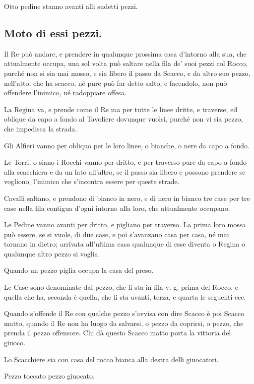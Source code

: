 \documentclass[11pt,a6paper]{article}
\begin{document}
Otto pedine stanno avanti alli sudetti
pezzi.

\subsection{Moto di essi pezzi.}

Il Re può andare, e prendere in qualunque
prossima casa d'intorno alla sua, che
attualmente occupa, una sol volta può saltare
nella fila de' suoi pezzi col Rocco, purché
non si sia mai mosso, e sia libero il passo da
Scacco, e da altro suo pezzo, nell'atto, che
ha scacco, né pure può far detto salto, e
facendolo, non può offendere l'inimico, né radoppiare
offesa.

La Regina va, e prende come il Re ma
per tutte le linee dritte, e traverse, ed oblique
da capo a fondo al Tavoliere dovunque
vuolsi, purché non vi sia pezzo, che impedisca la strada.

Gli Alfieri vanno per obliquo per le loro
linee, o bianche, o nere da capo a fondo.

Le Torri, o siano i Rocchi vanno per
dritto, e per traverso pure da capo a fondo
alla scacchiera e da un lato all'altro, se il passo
sia libero e possono prendere se vogliono, l'inimico
che s'incontra essere per queste strade.

Cavalli saltano, e prendono di bianco
in nero, e di nero in bianco tre case per tre
case nella fila contigua d'ogni intorno alla
loro, che attualmente occupano.

Le Pedine vanno avanti per dritto, e pigliano
per traverso. La prima loro mossa
può essere, se si vuole, di due case, e poi
s'avanzano casa per casa, né mai tornano in
dietro; arrivata all'ultima casa qualunque di
esse diventa o Regina o qualunque altro
pezzo si voglia.

Quando un pezzo piglia occupa la casa
del preso.

Le Case sono denominate dal pezzo, che
li sta in fila v. g. prima del Rocco, e quella
che ha, seconda è quella, che li sta avanti,
terza, e quarta le seguenti ecc.

Quando s'offende il Re con qualche pezzo
s'avvisa con dire Scacco è poi Scacco
matto, quando il Re non ha luogo da salvarsi, o
pezzo da coprirsi, o pezzo, che prenda il
pezzo offensore. Chi dà questo Scacco matto
porta la vittoria del giuoco.

Lo Scacchiere sia con casa del rocco bianca
alla destra delli giuocatori.

Pezzo toccato pezzo giuocato.
\end{document}
